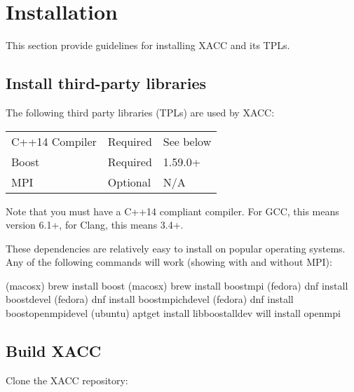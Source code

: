 \documentclass[letterpaper,10pt,english]{sphinxmanual}
\begin{document}
\chapter{Installation}
\label{\detokenize{install:installation}}\label{\detokenize{install::doc}}
This section provide guidelines for installing XACC and its TPLs.


\section{Install third-party libraries}
\label{\detokenize{install:install-third-party-libraries}}
The following third party libraries (TPLs) are used by XACC:


\begin{savenotes}\sphinxattablestart
\centering
\begin{tabulary}{\linewidth}[t]{|T|T|T|}
\hline
{}\relax &\relax &\relax \\
\hline
C++14 Compiler
&
Required
&
See below
\\
\hline
Boost
&
Required
&
1.59.0+
\\
\hline
MPI
&
Optional
&
N/A
\\
\hline
\end{tabulary}
\par
\sphinxattableend\end{savenotes}

Note that you must have a C++14 compliant compiler.
For GCC, this means version 6.1+, for Clang, this means 3.4+.

These dependencies are relatively easy to install on popular operating
systems. Any of the following commands will work (showing with and without MPI):

\begin{sphinxVerbatim}[commandchars=\\\{\}]
\PYGZdl{} (macosx) brew install boost
\PYGZdl{} (macosx) brew install boost\PYGZhy{}mpi
\PYGZdl{} (fedora) dnf install boost\PYGZhy{}devel
\PYGZdl{} (fedora) dnf install boost\PYGZhy{}mpich\PYGZhy{}devel
\PYGZdl{} (fedora) dnf install boost\PYGZhy{}openmpi\PYGZhy{}devel
\PYGZdl{} (ubuntu) apt\PYGZhy{}get install libboost\PYGZhy{}all\PYGZhy{}dev \PYGZsh{} will install openmpi
\end{sphinxVerbatim}


\section{Build XACC}
\label{\detokenize{install:build-xacc}}
Clone the XACC repository:
\end{document}
